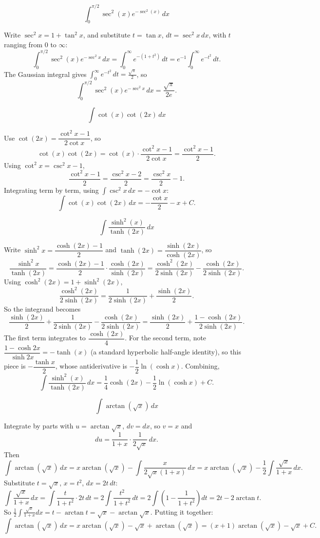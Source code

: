 \begin{questions}
\question
\[ \int_0^{\pi/2} \sec^2(x)e^{-\sec^2(x)}\,dx \]
\begin{solution}
Write $\sec^2x = 1+\tan^2x$, and substitute $t = \tan x$, $dt = \sec^2 x\,dx$, with $t$ ranging from $0$ to $\infty$:
\[ \int_0^{\pi/2}\sec^2(x)e^{-\sec^2x}\,dx = \int_0^\infty e^{-(1+t^2)}\,dt = e^{-1}\int_0^\infty e^{-t^2}\,dt. \]
The Gaussian integral gives $\displaystyle\int_0^\infty e^{-t^2}\,dt = \frac{\sqrt\pi}{2}$, so
\[ \int_0^{\pi/2}\sec^2(x)e^{-\sec^2x}\,dx = \frac{\sqrt\pi}{2e}. \]
\end{solution}

\question
\[ \int \cot(x)\cot(2x)\,dx \]
\begin{solution}
Use $\cot(2x) = \dfrac{\cot^2x-1}{2\cot x}$, so
\[ \cot(x)\cot(2x) = \cot(x)\cdot\frac{\cot^2x-1}{2\cot x} = \frac{\cot^2x-1}{2}. \]
Using $\cot^2x = \csc^2x - 1$,
\[ \frac{\cot^2x - 1}{2} = \frac{\csc^2x-2}{2} = \frac{\csc^2x}{2} - 1. \]
Integrating term by term, using $\int \csc^2x\,dx = -\cot x$:
\[ \int \cot(x)\cot(2x)\,dx = -\frac{\cot x}{2} - x + C. \]
\end{solution}

\question
\[ \int \frac{\sinh^2(x)}{\tanh(2x)}\,dx \]
\begin{solution}
Write $\sinh^2x = \dfrac{\cosh(2x)-1}{2}$ and $\tanh(2x) = \dfrac{\sinh(2x)}{\cosh(2x)}$, so
\[ \frac{\sinh^2x}{\tanh(2x)} = \frac{\cosh(2x)-1}{2}\cdot\frac{\cosh(2x)}{\sinh(2x)} = \frac{\cosh^2(2x)}{2\sinh(2x)} - \frac{\cosh(2x)}{2\sinh(2x)}. \]
Using $\cosh^2(2x) = 1+\sinh^2(2x)$,
\[ \frac{\cosh^2(2x)}{2\sinh(2x)} = \frac{1}{2\sinh(2x)} + \frac{\sinh(2x)}{2}. \]
So the integrand becomes
\[ \frac{\sinh(2x)}{2} + \frac{1}{2\sinh(2x)} - \frac{\cosh(2x)}{2\sinh(2x)} = \frac{\sinh(2x)}{2} + \frac{1-\cosh(2x)}{2\sinh(2x)}. \]
The first term integrates to $\dfrac{\cosh(2x)}{4}$. For the second term, note $\dfrac{1-\cosh2x}{\sinh2x} = -\tanh(x)$ (a standard hyperbolic half-angle identity), so this piece is $-\dfrac{\tanh x}{2}$, whose antiderivative is $-\dfrac12\ln(\cosh x)$. Combining,
\[ \int \frac{\sinh^2(x)}{\tanh(2x)}\,dx = \frac{1}{4}\cosh(2x) - \frac{1}{2}\ln(\cosh x) + C. \]
\end{solution}

\question
\[ \int \arctan(\sqrt{x})\,dx \]
\begin{solution}
Integrate by parts with $u=\arctan\sqrt x$, $dv=dx$, so $v=x$ and
\[ du = \frac{1}{1+x}\cdot\frac{1}{2\sqrt x}\,dx. \]
Then
\[ \int \arctan(\sqrt x)\,dx = x\arctan(\sqrt x) - \int \frac{x}{2\sqrt x(1+x)}\,dx = x\arctan(\sqrt x) - \frac12\int \frac{\sqrt x}{1+x}\,dx. \]
Substitute $t=\sqrt x$, $x=t^2$, $dx=2t\,dt$:
\[ \int \frac{\sqrt x}{1+x}\,dx = \int \frac{t}{1+t^2}\cdot 2t\,dt = 2\int \frac{t^2}{1+t^2}\,dt = 2\int\left(1-\frac{1}{1+t^2}\right)dt = 2t - 2\arctan t. \]
So $\displaystyle\frac12\int\frac{\sqrt x}{1+x}dx = t - \arctan t = \sqrt x - \arctan\sqrt x$. Putting it together:
\[ \int \arctan(\sqrt x)\,dx = x\arctan(\sqrt x) - \sqrt x + \arctan(\sqrt x) = (x+1)\arctan(\sqrt x) - \sqrt x + C. \]
\end{solution}


\end{questions}
